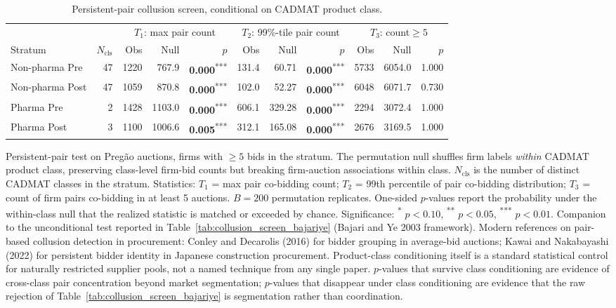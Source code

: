 \begin{table}[!htbp]
\centering
\begin{threeparttable}
\caption{Persistent-pair collusion screen, conditional on CADMAT product class.}
\label{tab:collusion_screen_pair_classcond}
\footnotesize
\setlength{\tabcolsep}{4pt}
\providecommand{\sym}[1]{\textsuperscript{#1}}
\begin{tabular}{lrrrrrrrrrr}
\toprule
 & & \multicolumn{3}{c}{$T_1$: max pair count} & \multicolumn{3}{c}{$T_2$: 99\%-tile pair count} & \multicolumn{3}{c}{$T_3$: count$\geq 5$} \\
\cmidrule(lr){3-5}\cmidrule(lr){6-8}\cmidrule(lr){9-11}
Stratum & $N_{\mathrm{cls}}$ & Obs & Null & $p$ & Obs & Null & $p$ & Obs & Null & $p$ \\
\midrule
Non-pharma Pre & 47 & 1220 & 767.9 & \textbf{0.000}\sym{***} & 131.4 & 60.71 & \textbf{0.000}\sym{***} & 5733 & 6054.0 & 1.000 \\
Non-pharma Post & 47 & 1059 & 870.8 & \textbf{0.000}\sym{***} & 102.0 & 52.27 & \textbf{0.000}\sym{***} & 6048 & 6071.7 & 0.730 \\
Pharma Pre & 2 & 1428 & 1103.0 & \textbf{0.000}\sym{***} & 606.1 & 329.28 & \textbf{0.000}\sym{***} & 2294 & 3072.4 & 1.000 \\
Pharma Post & 3 & 1100 & 1006.6 & \textbf{0.005}\sym{***} & 312.1 & 165.08 & \textbf{0.000}\sym{***} & 2676 & 3169.5 & 1.000 \\
\bottomrule
\end{tabular}
\begin{tablenotes}[flushleft]\footnotesize
\item Persistent-pair test on Preg\~ao auctions, firms with $\geq 5$ bids in the stratum. The permutation null shuffles firm labels \emph{within} CADMAT product class, preserving class-level firm-bid counts but breaking firm-auction associations within class. $N_{\mathrm{cls}}$ is the number of distinct CADMAT classes in the stratum. Statistics: $T_1$ = max pair co-bidding count; $T_2$ = 99th percentile of pair co-bidding distribution; $T_3$ = count of firm pairs co-bidding in at least 5 auctions. $B = 200$ permutation replicates. One-sided $p$-values report the probability under the within-class null that the realized statistic is matched or exceeded by chance. Significance: \sym{*} $p<0.10$, \sym{**} $p<0.05$, \sym{***} $p<0.01$. Companion to the unconditional test reported in Table~\ref{tab:collusion_screen_bajariye} (Bajari and Ye 2003 framework). Modern references on pair-based collusion detection in procurement: Conley and Decarolis (2016) for bidder grouping in average-bid auctions; Kawai and Nakabayashi (2022) for persistent bidder identity in Japanese construction procurement. Product-class conditioning itself is a standard statistical control for naturally restricted supplier pools, not a named technique from any single paper. $p$-values that survive class conditioning are evidence of cross-class pair concentration beyond market segmentation; $p$-values that disappear under class conditioning are evidence that the raw rejection of Table~\ref{tab:collusion_screen_bajariye} is segmentation rather than coordination.
\end{tablenotes}
\end{threeparttable}
\end{table}

